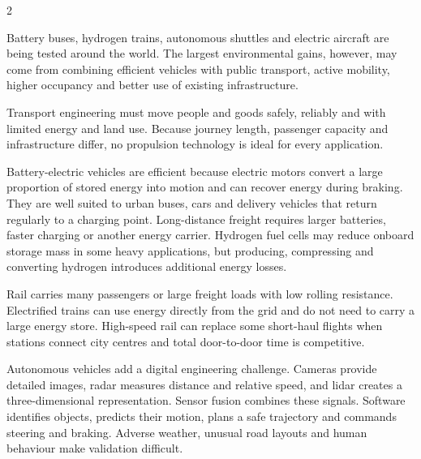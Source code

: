 

\begin{multicols}{2}
\begin{engineeringnews}
Battery buses, hydrogen trains, autonomous shuttles and electric aircraft are being tested around the
world. The largest environmental gains, however, may come from combining efficient vehicles with
public transport, active mobility, higher occupancy and better use of existing infrastructure.
\end{engineeringnews}

\begin{ecarticle}
Transport engineering must move people and goods safely, reliably and with limited energy and land
use. Because journey length, passenger capacity and infrastructure differ, no propulsion technology
is ideal for every application.

Battery-electric vehicles are efficient because electric motors convert a large proportion of stored
energy into motion and can recover energy during braking. They are well suited to urban buses, cars
and delivery vehicles that return regularly to a charging point. Long-distance freight requires
larger batteries, faster charging or another energy carrier. Hydrogen fuel cells may reduce onboard
storage mass in some heavy applications, but producing, compressing and converting hydrogen
introduces additional energy losses.

Rail carries many passengers or large freight loads with low rolling resistance. Electrified trains
can use energy directly from the grid and do not need to carry a large energy store. High-speed rail
can replace some short-haul flights when stations connect city centres and total door-to-door time is
competitive.

Autonomous vehicles add a digital engineering challenge. Cameras provide detailed images, radar
measures distance and relative speed, and lidar creates a three-dimensional representation. Sensor
fusion combines these signals. Software identifies objects, predicts their motion, plans a safe
trajectory and commands steering and braking. Adverse weather, unusual road layouts and human
behaviour make validation difficult.


\end{ecarticle}
\end{multicols}
